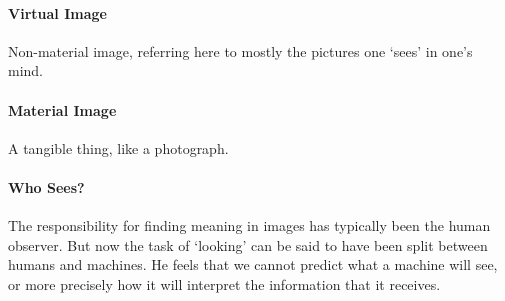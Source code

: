 \documentclass[a4paper]{article}
\begin{document}
\medskip
\paragraph{Virtual Image}\mbox{}

\medskip
\noindent Non-material image, referring here to mostly the pictures one `sees' in one's mind.

\medskip
\paragraph{Material Image}\mbox{}

\medskip
\noindent A tangible thing, like a photograph.

\medskip
\paragraph{Who Sees?}\mbox{}

\medskip
\noindent The responsibility for finding meaning in images has typically been the human observer. But now the task of `looking' can be said to have been split between humans and machines. He feels that we cannot predict what a machine will see, or more precisely how it will interpret the information that it receives. 
\end{document}
